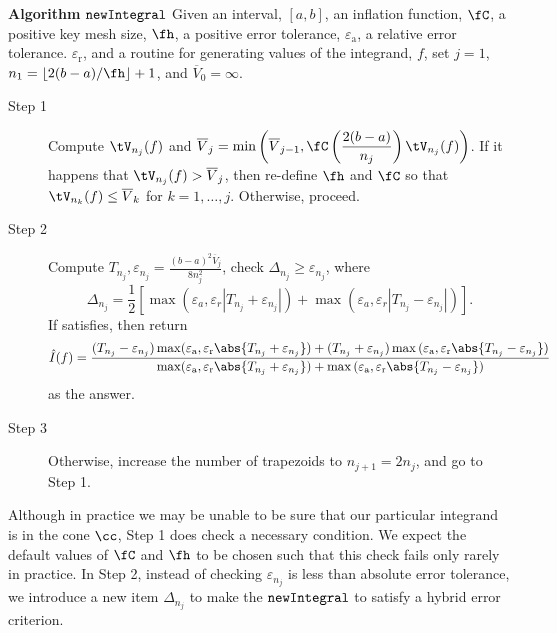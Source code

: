 \documentclass{iitthesis}
\DeclareMathOperator{\newinteg}{\texttt{\textup{newIntegral}}}
\newcommand{\oV}{\overline{V}}
\newcommand{\hcut}{\fh}
\newcommand{\abstol}{\varepsilon_{\textrm{a}}}
\newcommand{\reltol}{\varepsilon_{\textrm{r}}}
\begin{document}
\textbf{Algorithm }$\newinteg$ Given an interval, $[a,b]$, an inflation function, $\fC$, a positive key mesh size, $\hcut$, a positive error tolerance, $\abstol$, a relative error tolerance. $\reltol$, and a routine for generating values of the integrand, $f$, set $j=1$, $n_1 = \left \lfloor 2(b-a)/\hcut \right \rfloor +1$, and $\oV_0=\infty$.
\begin{description}
\item[Step 1] Compute $\tV_{n_j}(f)$ and $\displaystyle \oV_j = \min\left(\oV_{j-1}, \fC\left(\frac{2(b-a)}{n_j}\right)\tV_{n_j}(f) \right )$. If it happens that $\tV_{n_j}(f) >  \oV_{j}$, then re-define $\hcut$ and $\fC$ so that $\tV_{n_k}(f) \le   \oV_{k}$ for $k=1, \ldots, j$. Otherwise, proceed.

\item [Step 2] Compute $T_{n_j},\varepsilon_{n_j}=\frac{(b-a)^2 \oV_j}{8 n_j^2}$, check $\Delta_{n_j}\ge \varepsilon_{n_j}$, where
\begin{equation}\label{definDelta}
\Delta_{n_j}=\frac{1}{2}[\max(\varepsilon_{a},\varepsilon_{r}|T_{n_j}+\varepsilon_{n_j}|)+\max(\varepsilon_{a},\varepsilon_{r}|T_{n_j}-\varepsilon_{n_j}|)].
\end{equation}
If satisfies, then return 
\begin{align}\label{appdef}
\hat{I}(f)=\frac{(T_{n_j}-\varepsilon_{n_j}) \max ( \abstol,\reltol \abs{T_{n_j}+\varepsilon_{n_j}})+(T_{n_j} + \varepsilon_{n_j} ) \max{(\abstol, \reltol\abs{T_{n_j}-\varepsilon_{n_j}})}}{\max ( \abstol,\reltol \abs{T_{n_j}+\varepsilon_{n_j}})+\max{(\abstol, \reltol\abs{T_{n_j}-\varepsilon_{n_j}})}}
\end{align}
as the answer.  

\item [Step 3] Otherwise, increase the number of trapezoids to $n_{j+1} = 2 n_j$, and go to Step 1.

\end{description}
Although in practice we may be unable to be sure that our particular integrand is in the cone  $\cc$, Step 1 does check a necessary condition.  We expect the default values of $\fC$ and $\hcut$ to be chosen such that this check fails only rarely in practice. In Step 2, instead of checking $\varepsilon_{n_j}$ is less than absolute error tolerance, we introduce a new item $\Delta_{n_j}$ to make the $\newinteg$ to satisfy a hybrid error criterion.
\end{document}
